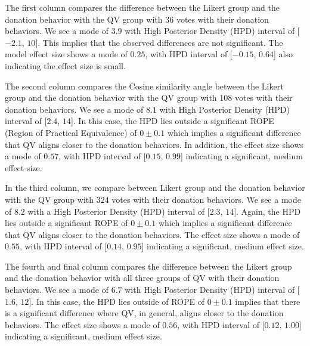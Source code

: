 The first column compares the difference between the Likert group
and the donation behavior with the QV group with $36$ votes
with their donation behaviors. We see a mode of $3.9$
with High Posterior Density (HPD) interval of [$-2.1$, $10$].
This implies that the observed differences are not significant.
The model effect size shows a mode of $0.25$, 
with HPD interval of [$-0.15$, $0.64$] 
also indicating the effect size is small.

The second column compares the Cosine similarity angle between the Likert group
and the donation behavior with the QV group with 108 votes
with their donation behaviors. We see a mode of $8.1$
with High Posterior Density (HPD) interval of [$2.4$, $14$].
In this case, the HPD lies outside a significant ROPE (Region of Practical Equivalence) of $0 \pm 0.1$
which implies a significant difference that
QV aligns closer to the donation behaviors.
In addition, the effect size shows a mode of $0.57$, 
with HPD interval of [$0.15$, $0.99$] 
indicating a significant, medium effect size.

In the third column, we compare between Likert group
and the donation behavior with the QV group with $324$ votes
with their donation behaviors. We see a mode of $8.2$
with a High Posterior Density (HPD) interval of [$2.3$, $14$].
Again, the HPD lies outside a significant ROPE of $0 \pm 0.1$
which implies a significant difference that
QV aligns closer to the donation behaviors.
The effect size shows a mode of $0.55$, 
with HPD interval of [$0.14$, $0.95$] 
indicating a significant, medium effect size.

The fourth and final column 
compares the difference between the Likert group
and the donation behavior with all three groups of QV
with their donation behaviors. We see a mode of $6.7$
with High Posterior Density (HPD) interval of [$1.6$, $12$].
In this case, the HPD lies outside of ROPE of $0 \pm 0.1$
implies that there is a significant difference where
QV, in general, aligns closer to the donation behaviors.
The effect size shows a mode of $0.56$, 
with HPD interval of [$0.12$, $1.00$] 
indicating a significant, medium effect size.



